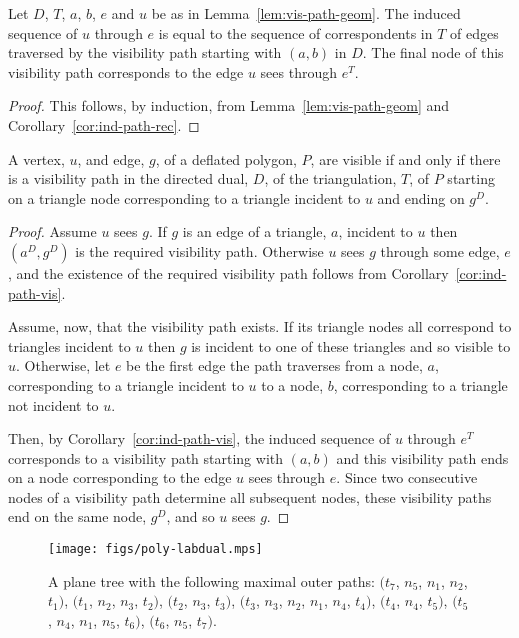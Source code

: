 \documentclass{amsart}
\begin{document}
\begin{cor}
  \label{cor:ind-path-vis}
  Let $D$, $T$, $a$, $b$, $e$ and $u$ be as in
  Lemma~\ref{lem:vis-path-geom}.  The induced sequence of $u$ through
  $e$ is equal to the sequence of correspondents in $T$ of edges
  traversed by the visibility path starting with $(a,b)$ in $D$.  The
  final node of this visibility path corresponds to the edge $u$ sees
  through $e^T$.
\end{cor}
\iffullversion
\begin{proof}
  This follows, by induction, from Lemma~\ref{lem:vis-path-geom} and
  Corollary~\ref{cor:ind-path-rec}.
\end{proof}
\fi

\begin{theorem}
  \label{thm:dd-det-ve}
  A vertex, $u$, and edge, $g$, of a deflated polygon, $P$, are
  visible if and only if there is a visibility path in the directed
  dual, $D$, of the triangulation, $T$, of $P$ starting on a triangle
  node corresponding to a triangle incident to $u$ and ending on
  $g^D$.
\end{theorem}
\begin{proof}
  Assume $u$ sees $g$.  If $g$ is an edge of a triangle, $a$, incident
  to $u$ then $(a^D, g^D)$ is the required visibility path.  Otherwise
  $u$ sees $g$ through some edge, $e$, and the existence of the
  required visibility path follows from
  Corollary~\ref{cor:ind-path-vis}.
  
  Assume, now, that the visibility path exists.  If its triangle nodes
  all correspond to triangles incident to $u$ then $g$ is incident to
  one of these triangles and so visible to $u$.  Otherwise, let $e$ be
  the first edge the path traverses from a node, $a$, corresponding to
  a triangle incident to $u$ to a node, $b$, corresponding to a
  triangle not incident to $u$.
  
  Then, by Corollary~\ref{cor:ind-path-vis}, the induced sequence of
  $u$ through $e^T$ corresponds to a visibility path starting with
  $(a, b)$ and this visibility path ends on a node corresponding to
  the edge $u$ sees through $e$.  Since two consecutive nodes of a
  visibility path determine all subsequent nodes, these visibility
  paths end on the same node, $g^D$, and so $u$ sees $g$.
\end{proof}


\begin{figure}[htb]
  \centering \texttt{[image: figs/poly-labdual.mps]}
  \caption{A plane tree with the following maximal outer paths:
    $(t_7$, $n_5$, $n_1$, $n_2$, $t_1)$, $(t_1$, $n_2$, $n_3$, $t_2)$,
    $(t_2$, $n_3$, $t_3)$, $(t_3$, $n_3$, $n_2$, $n_1$, $n_4$, $t_4)$,
    $(t_4$, $n_4$, $t_5)$, $(t_5$, $n_4$, $n_1$, $n_5$, $t_6)$,
    $(t_6$, $n_5$, $t_7)$.}
  \label{fig:outer-path}
\end{figure}
\end{document}
